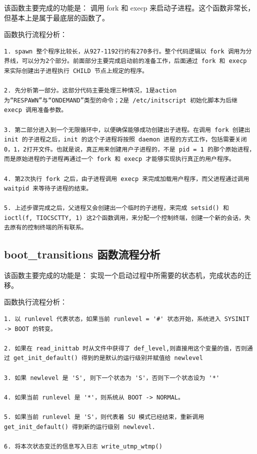 该函数主要完成的功能是： 调用 fork 和 execp
来启动子进程。这个函数非常长，但基本上是属于最底层的函数了。

函数执行流程分析：

{\begin{shaded}\begin{verbatim}
1. spawn 整个程序比较长，从927-1192行约有270多行。整个代码逻辑以 fork 调用为分界线，可以分为2个部分。前面部分主要完成启动前的准备工作，后面通过 fork 和 execp 来实际创建出子进程执行 CHILD 节点上规定的程序。

2. 先分析第一部分。这部分代码主要处理三种情况，1是action 为“RESPAWN”与“ONDEMAND”类型的命令；2是 /etc/initscript 初始化脚本为后继 execp 调用准备参数。

3. 第二部分进入到一个无限循环中，以便确保能够成功创建出子进程。在调用 fork 创建出 init 的子进程之后，init 的这个子进程将按照 daemon 进程的方式工作，包括需要关闭0，1，2打开文件。也就是说，真正用来创建用户子进程的，不是 pid = 1 的那个原始进程，而是原始进程的子进程再通过一个 fork 和 execp 才能够实现执行真正的用户程序。

4. 第2次执行 fork 之后，由子进程调用 execp 来完成加载用户程序，而父进程通过调用 waitpid 来等待子进程的结束。

5. 上述步骤完成之后，父进程又会创建出一个临时的子进程，来完成 setsid() 和 ioctl(f, TIOCSCTTY, 1) 这2个函数调用，来分配一个控制终端，创建一个新的会话，失去原有的控制终端的所有联系。
\end{verbatim}\end{shaded}}
\subsection{boot\_transitions 函数流程分析}

该函数主要完成的功能是：
实现一个启动过程中所需要的状态机，完成状态的迁移。

函数执行流程分析：

{\begin{shaded}\begin{verbatim}
1. 以 runlevel 代表状态，如果当前 runlevel = '#' 状态开始，系统进入 SYSINIT -> BOOT 的转变。

2. 如果在 read_inittab 时从文件中获得了 def_level,则直接用这个变量的值，否则通过 get_init_default() 得到的是默认的运行级别并赋值给 newlevel

3. 如果 newlevel 是 'S', 则下一个状态为 'S'，否则下一个状态设为 '*'

4. 如果当前 runlevel 是 '*'，则系统从 BOOT -> NORMAL。

5. 如果当前 runlevel 是 'S'，则代表着 SU 模式已经结束，重新调用 get_init_default() 得到新的运行级别 newlevel.

6. 将本次状态变迁的信息写入日志 write_utmp_wtmp()
\end{verbatim}\end{shaded}}
